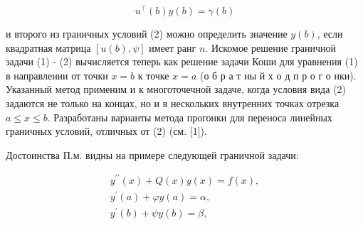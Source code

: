 \documentclass[10pt]{article}
\begin{document}
\[

u^{\top}(b) y(b)=\gamma(b)

\]



и второго из граничных условий (2) можно определить значение $y(b)$, если квадратная матрица $[u(b), \psi]$ имеет ранг $n$. Искомое решение граничной задачи (1) - (2) вычисляется теперь как решение задачи Коши для уравнения (1) в направлении от точки $x=b$ к точке $x=a$ (о б р а т ны й х о д п р о г о нки). Указанный метод применим и к многоточечной задаче, когда условия вида (2) задаются не только на концах, но и в нескольких внутренних точках отрезка $a \leqslant x \leqslant b$. Разработаны варианты метода прогонки для переноса линейных граничных условий, отличных от (2) (см. [1]).



Достоинства П.м. видны на примере следующей граничной задачи:



\[

\begin{gathered}

y^{\prime \prime}(x)+Q(x) y(x)=f(x), \\

y^{\prime}(a)+\varphi y(a)=\alpha, \\

y^{\prime}(b)+\psi y(b)=\beta,

\end{gathered}

\]
\end{document}

